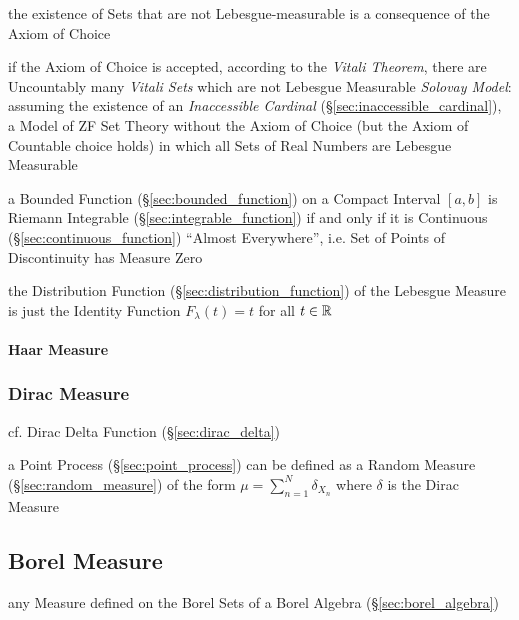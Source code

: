 the existence of Sets that are not Lebesgue-measurable is a consequence of the
Axiom of Choice

if the Axiom of Choice is accepted, according to the \emph{Vitali Theorem},
there are Uncountably many \emph{Vitali Sets} which are not Lebesgue Measurable
\emph{Solovay Model}: assuming the existence of an \emph{Inaccessible Cardinal}
(\S\ref{sec:inaccessible_cardinal}), a Model of ZF Set Theory without the Axiom
of Choice (but the Axiom of Countable choice holds) in which all Sets of Real
Numbers are Lebesgue Measurable

a Bounded Function (\S\ref{sec:bounded_function}) on a Compact Interval $[a,b]$
is Riemann Integrable (\S\ref{sec:integrable_function}) if and only if it is
Continuous (\S\ref{sec:continuous_function}) ``Almost Everywhere'', i.e. Set of
Points of Discontinuity has Measure Zero

the Distribution Function (\S\ref{sec:distribution_function}) of the Lebesgue
Measure is just the Identity Function $F_\lambda(t) = t$ for all $t \in \mathbb{R}$



\paragraph{Haar Measure}\label{sec:haar_measure}\hfill



\subsubsection{Dirac Measure}\label{sec:dirac_measure}

cf. Dirac Delta Function (\S\ref{sec:dirac_delta})

a Point Process (\S\ref{sec:point_process}) can be defined as a Random Measure
(\S\ref{sec:random_measure}) of the form $\mu = \sum_{n=1}^N \delta_{X_n}$ where
$\delta$ is the Dirac Measure



\subsection{Borel Measure}\label{sec:borel_measure}

any Measure defined on the Borel Sets of a Borel Algebra
(\S\ref{sec:borel_algebra})

